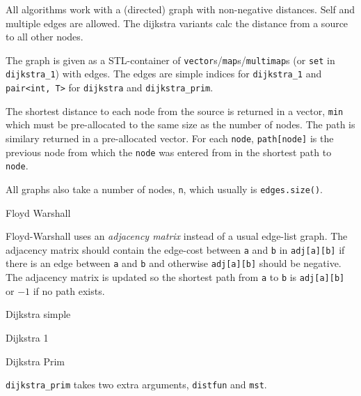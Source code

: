 
All algorithms work with a (directed) graph with non-negative distances.
Self and multiple edges are allowed. The dijkstra variants calc the
distance from a source to all other nodes.

The graph is given as a STL-container of
{\tt vector}s/{\tt map}s/{\tt multimap}s
(or {\tt set} in {\tt dijkstra\_1}) with edges.
The edges are simple indices for {\tt dijkstra\_1} and {\tt pair<int, T>} for
{\tt dijkstra} and {\tt dijkstra\_prim}.

The shortest distance to each node from the source is returned in a vector,
{\tt min} which must be pre-allocated to the same size as the number of nodes.
The path is similary returned in a pre-allocated vector. For each {\tt node},
{\tt path[node]} is the previous node from which the {\tt node} was entered
from in the shortest path to {\tt node}.

All graphs also take a number of nodes, {\tt n}, which usually is
{\tt edges.size()}.

\begin{algorithm}{Floyd Warshall}

Floyd-Warshall uses an \emph{adjacency matrix} instead of a usual edge-list
graph. The adjacency matrix should contain the edge-cost between
{\tt a} and {\tt b} in {\tt adj[a][b]} if there is an edge between
{\tt a} and {\tt b} and otherwise {\tt adj[a][b]} should be negative.
The adjacency matrix is updated so the shortest path from {\tt a} to
{\tt b} is {\tt adj[a][b]} or $-1$ if no path exists.
\end{algorithm}

\begin{algorithm}{Dijkstra simple}
\end{algorithm}

\begin{algorithm}{Dijkstra 1}
\end{algorithm}

\begin{algorithm}{Dijkstra Prim}

{\tt dijkstra\_prim} takes two extra arguments, {\tt distfun} and {\tt mst}.
\end{algorithm}
